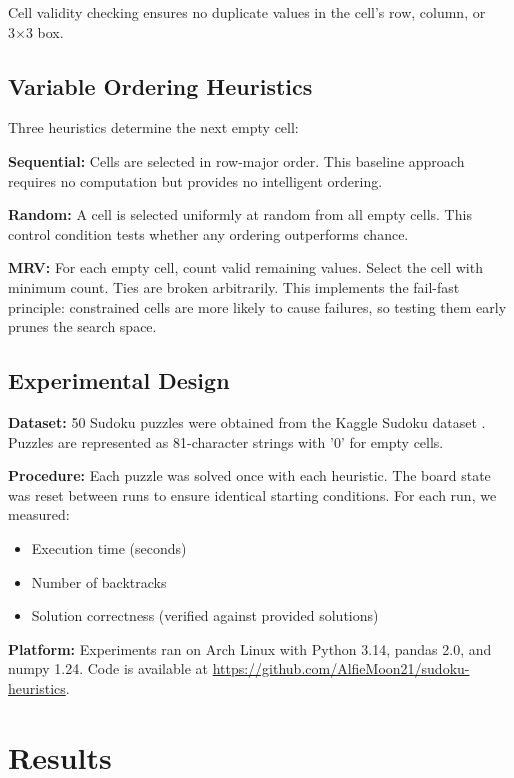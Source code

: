 \documentclass[conference]{IEEEtran}
\begin{document}
Cell validity checking ensures no duplicate values in the cell's row, column, or 3×3 box.

\subsection{Variable Ordering Heuristics}

Three heuristics determine the next empty cell:

\textbf{Sequential:} Cells are selected in row-major order. This baseline approach requires no computation but provides no intelligent ordering.

\textbf{Random:} A cell is selected uniformly at random from all empty cells. This control condition tests whether any ordering outperforms chance.

\textbf{MRV:} For each empty cell, count valid remaining values. Select the cell with minimum count. Ties are broken arbitrarily. This implements the fail-fast principle: constrained cells are more likely to cause failures, so testing them early prunes the search space.

\subsection{Experimental Design}

\textbf{Dataset:} 50 Sudoku puzzles were obtained from the Kaggle Sudoku dataset \cite{kaggle_sudoku}. Puzzles are represented as 81-character strings with '0' for empty cells.

\textbf{Procedure:} Each puzzle was solved once with each heuristic. The board state was reset between runs to ensure identical starting conditions. For each run, we measured:
\begin{itemize}
    \item Execution time (seconds)
    \item Number of backtracks
    \item Solution correctness (verified against provided solutions)
\end{itemize}

\textbf{Platform:} Experiments ran on Arch Linux with Python 3.14, pandas 2.0, and numpy 1.24. Code is available at \url{https://github.com/AlfieMoon21/sudoku-heuristics}.

\section{Results}
\end{document}
